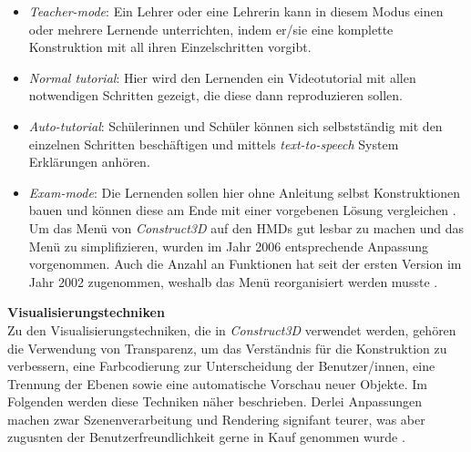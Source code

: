 \documentclass[deutsch]{llncs}
\begin{document}
\begin{itemize}
\item \emph{Teacher-mode}:
Ein Lehrer oder eine Lehrerin kann in diesem Modus einen oder mehrere Lernende unterrichten, indem er/sie eine komplette Konstruktion mit all ihren Einzelschritten vorgibt. 
\item \emph{Normal tutorial}:
Hier wird den Lernenden ein Videotutorial mit allen notwendigen Schritten gezeigt, die diese dann reproduzieren sollen. 
\item \emph{Auto-tutorial}:
Schülerinnen und Schüler können sich selbstständig mit den einzelnen Schritten beschäftigen und mittels \emph{text-to-speech} System Erklärungen anhören. 
\item \emph{Exam-mode}: 
Die Lernenden sollen hier ohne Anleitung selbst Konstruktionen bauen und können diese am Ende mit einer vorgebenen Lösung vergleichen \cite{article}. 
Um das Menü von \emph{Construct3D} auf den HMDs gut lesbar zu machen und das Menü zu simplifizieren, wurden im Jahr 2006 entsprechende Anpassung vorgenommen. Auch die Anzahl an Funktionen hat seit  der ersten Version im Jahr 2002 zugenommen, weshalb das Menü reorganisiert werden musste \cite{1667626}. \\\end{itemize}
\textbf{Visualisierungstechniken} \\
Zu den Visualisierungstechniken, die in \emph{Construct3D} verwendet werden, gehören die Verwendung von Transparenz, um das Verständnis für die Konstruktion zu verbessern, eine Farbcodierung zur Unterscheidung der Benutzer/innen, eine Trennung der Ebenen sowie eine automatische Vorschau neuer Objekte. Im Folgenden werden diese Techniken näher beschrieben. Derlei Anpassungen machen zwar Szenenverarbeitung und Rendering signifant teurer, was aber zugusnten der Benutzerfreundlichkeit gerne in Kauf genommen wurde \cite{1667626}. 
\end{document}
